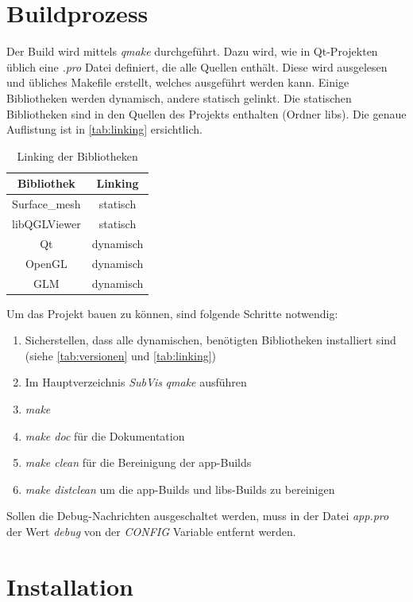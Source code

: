 \section{Buildprozess}

Der Build wird mittels \emph{qmake} durchgeführt.
Dazu wird, wie in Qt-Projekten üblich eine \emph{.pro} Datei definiert, die alle Quellen enthält. 
Diese wird ausgelesen und übliches Makefile erstellt, welches ausgeführt werden kann.
Einige Bibliotheken werden dynamisch, andere statisch gelinkt. 
Die statischen Bibliotheken sind in den Quellen des Projekts enthalten (Ordner libs).
Die genaue Auflistung ist in \autoref{tab:linking} ersichtlich.

\begin{table}[h]
\center
\caption{Linking der Bibliotheken}
\label{tab:linking}
\begin{tabular}{c|c}
Bibliothek & Linking\\
\hline
Surface\_mesh & statisch\\
libQGLViewer & statisch\\
Qt & dynamisch\\
OpenGL & dynamisch\\
GLM & dynamisch\\
\end{tabular}
\end{table}

Um das Projekt bauen zu können, sind folgende Schritte notwendig:

\begin{enumerate}
\item Sicherstellen, dass alle dynamischen, benötigten Bibliotheken installiert sind (siehe \autoref{tab:versionen} und \autoref{tab:linking})
\item Im Hauptverzeichnis \emph{SubVis} \emph{qmake} ausführen
\item \emph{make}
\item \emph{make doc} für die Dokumentation
\item \emph{make clean} für die Bereinigung der app-Builds
\item \emph{make distclean} um die app-Builds und libs-Builds zu bereinigen
\end{enumerate}

Sollen die Debug-Nachrichten ausgeschaltet werden, muss in der Datei \emph{app.pro} der Wert \emph{debug} von der \emph{CONFIG} Variable entfernt werden.

\section{Installation}

